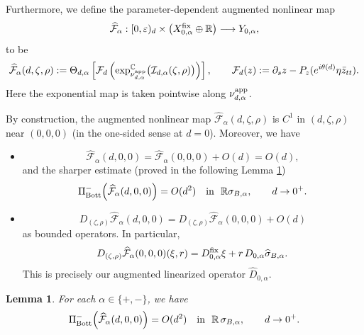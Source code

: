 \documentclass[11pt]{amsart}
\theoremstyle{plain}
\newtheorem{lem}[thm]{Lemma}
\theoremstyle{definition}
\newcommand{\R}{\mathbb{R}}
\newcommand{\C}{\mathbb{C}}
\begin{document}
Furthermore, we define the parameter-dependent augmented nonlinear map 
\[
\widehat{\mathcal F}_{\alpha}:
[0,\varepsilon)_d\times
\bigl(X^{\rm fix}_{0,\alpha}\oplus\R\bigr)
\longrightarrow Y_{0,\alpha},
\]
to be
\[
\widehat{\mathcal F}_{\alpha}(d,\zeta,\rho)
:=\Theta_{d,\alpha}\left[\mathcal F_d
\left(\exp_{\nu^{\rm app}_{d,\alpha}}^{\C}
\bigl(\mathcal I_{d,\alpha}(\zeta,\rho)\bigr)\right)
\right],\qquad \mathcal{F}_d(z):=\partial_sz-P_z(e^{i\theta(d)}\eta\bar{z}_{tt}).
\]
Here the exponential map is taken pointwise along
$\nu^{\rm app}_{d,\alpha}$. 

By construction, the augmented nonlinear map $\widehat{\mathcal F}_{\alpha}(d,\zeta,\rho)$ is $C^1$ in $(d,\zeta,\rho)$ near $(0,0,0)$ (in the one-sided sense at $d=0$).  Moreover, we have
\begin{itemize}
    \item \[
\widehat{\mathcal F}_{\alpha}(d,0,0)
=\widehat{\mathcal F}_{\alpha}(0,0,0)+O(d)=O(d),
\]
and the sharper estimate (proved in the following Lemma \ref{lem:quadratic-upper-bott})
\[
\Pi_{\rm Bott}^-\Bigl(\widehat{\mathcal F}_{\alpha}(d,0,0)\Bigr)=O(d^2)
\quad\text{in }~\R\sigma_{B,\alpha},
\qquad d\to0^+.
\]
    \item \[
D_{(\zeta,\rho)}
\widehat{\mathcal F}_{\alpha}(d,0,0)
=D_{(\zeta,\rho)}
\widehat{\mathcal F}_{\alpha}(0,0,0)
+O(d)
\]
as bounded operators. In particular,
\[
D_{(\zeta,\rho)}
\widehat{\mathcal F}_{\alpha}(0,0,0)(\xi,r)
=D^{\rm fix}_{0,\alpha}\xi
+r\,D_{0,\alpha}\widehat\sigma_{B,\alpha}.
\]
This is precisely our augmented linearized operator $\widehat{D}_{0,\alpha}$.
\end{itemize}


\begin{lem}\label{lem:quadratic-upper-bott}
For each $\alpha\in\{+,-\}$, we have
\[
\Pi_{\rm Bott}^-\Bigl(\widehat{\mathcal F}_{\alpha}(d,0,0)\Bigr)=O(d^2)
\quad\text{in }~ \R\,\sigma_{B,\alpha},
\qquad d\to0^+.
\]   
\end{lem}
\end{document}
